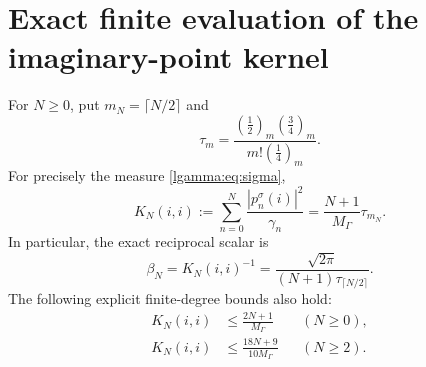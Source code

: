 \documentclass[11pt]{article}
\begin{document}
\section{Exact finite evaluation of the imaginary-point kernel}

\begin{lgammatheorem}\label{lgamma:thm:kernel}
For $N\ge0$, put $m_N=\lceil N/2\rceil$ and
\[
 \tau_m=\frac{(\tfrac12)_m(\tfrac34)_m}{m!(\tfrac14)_m}.
\]
For precisely the measure \eqref{lgamma:eq:sigma},
\begin{equation}\label{lgamma:eq:exactkernel}
 \boxed{K_N(i,i):=\sum_{n=0}^N\frac{|p_n^\sigma(i)|^2}{\gamma_n}
       =\frac{N+1}{M_\Gamma}\tau_{m_N}.}
\end{equation}
In particular, the exact reciprocal scalar is
\begin{equation}\label{lgamma:eq:beta}
 \boxed{\beta_N=K_N(i,i)^{-1}
 =\frac{\sqrt{2\pi}}{(N+1)\tau_{\lceil N/2\rceil}}.}
\end{equation}
The following explicit finite-degree bounds also hold:
\begin{align}
 K_N(i,i)&\le\frac{2N+1}{M_\Gamma}&& (N\ge0),\label{lgamma:eq:linear}\\
 K_N(i,i)&\le\frac{18N+9}{10M_\Gamma}&& (N\ge2).\label{lgamma:eq:betterlinear}
\end{align}
\end{lgammatheorem}
\end{document}
